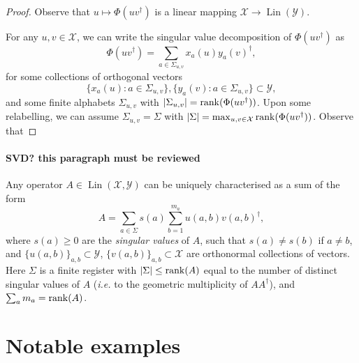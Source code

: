 \documentclass[12pt]{report}
\newcommand{\calY}{{\mathcal{Y}}}
\newcommand{\calX}{{\mathcal{X}}}
\DeclareMathOperator{\Lin}{Lin}
\begin{document}
\begin{proof}
	Observe that $u\mapsto\Phi(uv^\dagger)$ is a linear mapping $\calX\to\Lin(\calY)$.

	For any $u,v\in\calX$, we can write the singular value decomposition of $\Phi(uv^\dagger)$ as
	\begin{equation}
		\Phi(uv^\dagger) = \sum_{a\in\Sigma_{u,v}} x_a(u) y_a(v)^\dagger,
	\end{equation}
	for some collections of orthogonal vectors
	\begin{equation}
		\{x_a(u): a \in\Sigma_{u,v}\},
		\{y_a(v): a \in\Sigma_{u,v}\}\subset\calY,
	\end{equation}
	and some finite alphabets $\Sigma_{u,v}$ with $\lvert\Sigma_{u,v}\rvert=\rank(\Phi(uv^\dagger))$.
	Upon some relabelling, we can assume $\Sigma_{u,v}=\Sigma$ with $\lvert\Sigma\rvert=\max_{u,v\in\calX}\rank(\Phi(uv^\dagger))$.
	Observe that 
\end{proof}

\paragraph{SVD? this paragraph must be reviewed}
Any operator $A\in\Lin(\calX,\calY)$ can be uniquely characterised as a sum of the form
\begin{equation}
	A = \sum_{a\in\Sigma} s(a)
	\sum_{b=1}^{m_a} u(a,b) v(a,b)^\dagger,
\end{equation}
where $s(a)\ge0$ are the \emph{singular values} of $A$, such that $s(a)\neq s(b)$ if $a\neq b$, and $\{u(a,b)\}_{a,b}\subset\calY$,
$\{v(a,b)\}_{a,b}\subset\calX$ are orthonormal collections of vectors.
Here $\Sigma$ is a finite register with $\lvert\Sigma\rvert\le \rank(A)$ equal to the number of distinct singular values of $A$ (\emph{i.e.} to the geometric multiplicity of $AA^\dagger$), and $\sum_a m_a=\rank(A)$.


\section{Notable examples}
\end{document}
